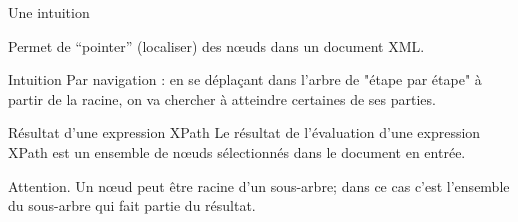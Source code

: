\begin{frame}{Une intuition}

Permet de ``pointer'' (localiser) des n{\oe}uds dans un document XML.

\begin{exampleblock}{Intuition}
Par \alert{navigation} : en se déplaçant dans l'arbre de "étape par étape" à partir de la racine, on va chercher à 
   atteindre certaines de ses parties.
\end{exampleblock}

\vfill

\begin{block}{Résultat d'une expression XPath}
Le résultat de l'évaluation d'une expression XPath est un \alert{ensemble de n{\oe}uds} sélectionnés dans le
document en entrée.
\end{block}

\vfill

\alert{Attention}.  Un n{\oe}ud peut être racine d'un sous-arbre; dans ce cas
c'est l'ensemble du sous-arbre qui fait partie du résultat.
 
\end{frame}

